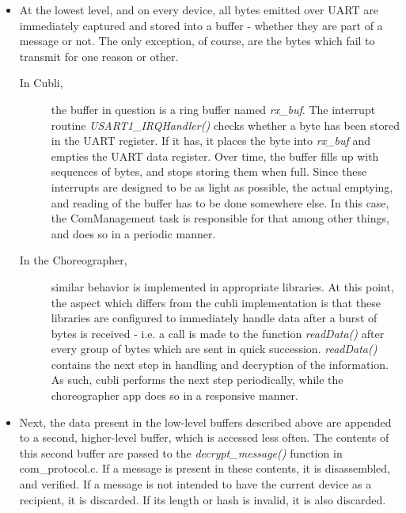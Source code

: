 \begin{itemize}
\item At the lowest level, and on every device, all bytes emitted over UART are immediately captured and stored into a buffer - whether they are part of a message or not. The only exception, of course, are the bytes which fail to transmit for one reason or other.

\begin{description}
\item[In Cubli,] the buffer in question is a ring buffer named \textit{rx\_buf}. The interrupt routine \textit{USART1\_IRQHandler()} checks whether a byte has been stored in the UART register. If it has, it places the byte into \textit{rx\_buf} and empties the UART data register. Over time, the buffer fills up with sequences of bytes, and stops storing them when full. Since these interrupts are designed to be as light as possible, the actual emptying, and reading of the buffer has to be done somewhere else. In this case, the ComManagement task is responsible for that among other things, and does so in a periodic manner.
\item[In the Choreographer,] similar behavior is implemented in appropriate libraries. At this point, the aspect which differs from the cubli implementation is that these libraries are configured to immediately handle data after a burst of bytes is received - i.e. a call is made to the function \textit{readData()} after every group of bytes which are sent in quick succession. \textit{readData()} contains the next step in handling and decryption of the information.
As such, cubli performs the next step periodically, while the choreographer app does so in a responsive manner.
\end{description}

\item Next, the data present in the low-level buffers described above are appended to a second, higher-level buffer, which is accessed less often. The contents of this second buffer are passed to the \textit{decrypt\_message()} function in com\_protocol.c. If a message is present in these contents, it is disassembled, and verified. If a message is not intended to have the current device as a recipient, it is discarded. If its length or hash is invalid, it is also discarded.


\end{itemize}
